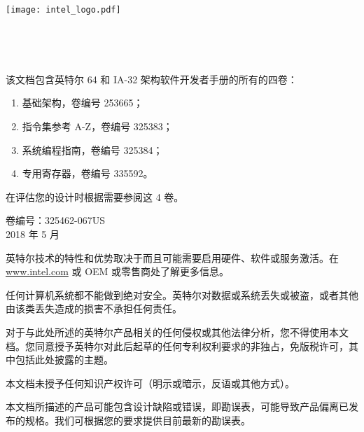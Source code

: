 \begin{titlepage}
\begin{flushright}
\vspace*{-1.5cm}
\texttt{[image: intel\_logo.pdf]}

\vspace*{2cm}

{\Huge \textbf{}\\\textbf{}}

\vspace{0.5cm}
{\LARGE {}\\
}
\end{flushright}

\vspace*{2cm}

\noindent{}该文档包含英特尔 64 和 IA-32 架构软件开发者手册的所有的四卷：
\begin{enumerate}
	\item 基础架构，卷编号 253665；
	\item 指令集参考 A-Z，卷编号 325383；
	\item 系统编程指南，卷编号 325384；
	\item 专用寄存器，卷编号 335592。
\end{enumerate}
在评估您的设计时根据需要参阅这 4 卷。

\vspace{7cm}

\begin{flushright}
卷编号：325462-067US\\
2018 年 5 月
\end{flushright}
\end{titlepage}

\thispagestyle{empty}
\vspace*{12cm}
英特尔技术的特性和优势取决于而且可能需要启用硬件、软件或服务激活。在 \url{www.intel.com} 或 OEM 或零售商处了解更多信息。

任何计算机系统都不能做到绝对安全。英特尔对数据或系统丢失或被盗，或者其他由该类丢失造成的损害不承担任何责任。

对于与此处所述的英特尔产品相关的任何侵权或其他法律分析，您不得使用本文档。您同意授予英特尔对此后起草的任何专利权利要求的非独占，免版税许可，其中包括此处披露的主题。

本文档未授予任何知识产权许可（明示或暗示，反语或其他方式）。

本文档所描述的产品可能包含设计缺陷或错误，即勘误表，可能导致产品偏离已发布的规格。我们可根据您的要求提供目前最新的勘误表。

